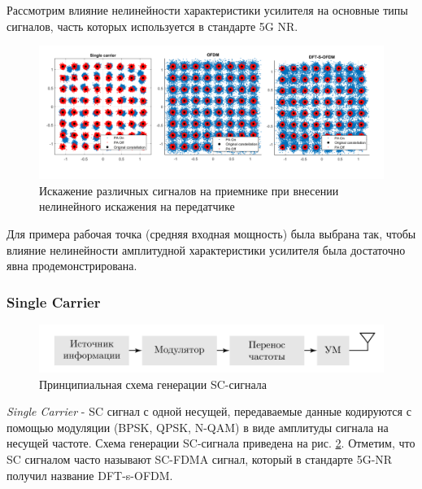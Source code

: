 


Рассмотрим влияние нелинейности характеристики усилителя на основные типы
сигналов, часть которых используется в стандарте 5G NR.

\begin{figure}[h!]
    \centering
    \includegraphics[width=0.98\linewidth]{figs/ofdm_pa_distortions.png}
    \caption{Искажение различных сигналов на приемнике при внесении нелинейного
    искажения на передатчике}
    \label{fig:lls_rapp_distortions_0}
\end{figure}

Для примера рабочая точка (средняя входная мощность) была выбрана так,
чтобы влияние нелинейности амплитудной характеристики усилителя была
достаточно явна продемонстрирована.
\subsubsection{Single Carrier}
\begin{figure}[h!]
    \centering
    \includegraphics[scale=1]{figs/sc_scheme.pdf}
    \caption{Принципиальная схема генерации SC-сигнала}
    \label{fig:sc_scheme}
\end{figure}
\textit{Single Carrier} - SC сигнал с одной несущей, передаваемые данные
кодируются с помощью модуляции (BPSK, QPSK, N-QAM) в виде амплитуды сигнала
на несущей частоте. Схема генерации SC-сигнала приведена на рис.
\ref{fig:sc_scheme}. Отметим, что SC сигналом часто называют SC-FDMA
сигнал, который в стандарте 5G-NR получил название DFT-s-OFDM.

